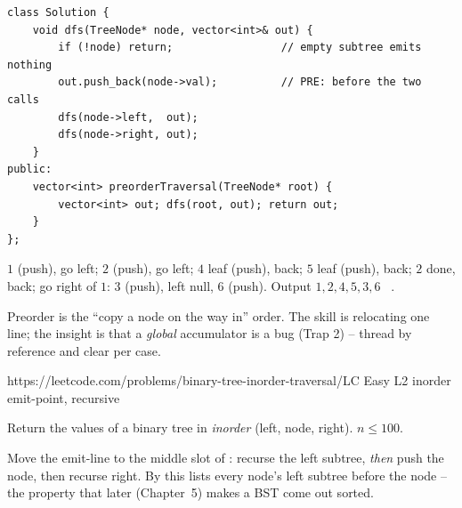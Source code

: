 \begin{lstlisting}[caption={Preorder (LeetCode 144)}, label={lst:c03-preorder}]
class Solution {
    void dfs(TreeNode* node, vector<int>& out) {
        if (!node) return;                 // empty subtree emits nothing
        out.push_back(node->val);          // PRE: before the two calls
        dfs(node->left,  out);
        dfs(node->right, out);
    }
public:
    vector<int> preorderTraversal(TreeNode* root) {
        vector<int> out; dfs(root, out); return out;
    }
};
\end{lstlisting}

\begin{tracebox}[On $R$]
$1$ (push), go left; $2$ (push), go left; $4$ leaf (push), back; $5$ leaf (push),
back; $2$ done, back; go right of $1$: $3$ (push), left null, $6$ (push).
Output $1,2,4,5,3,6$ \checkmark\ .
\end{tracebox}


\begin{insightbox}
Preorder is the ``copy a node on the way in'' order. The  skill is relocating one
line; the  insight is that a \emph{global} accumulator is a bug (Trap 2) -- thread
 by reference and clear per case.
\end{insightbox}

  {https://leetcode.com/problems/binary-tree-inorder-traversal/}{LC Easy L2}
  {inorder emit-point, recursive}

\begin{problemstatement}
Return the values of a binary tree in \emph{inorder} (left, node, right). $n \le 100$.
\end{problemstatement}

Move the emit-line to the middle slot of : recurse the left subtree,
\emph{then} push the node, then recurse right. By  this lists
every node's left subtree before the node -- the property that later (Chapter~5) makes a
BST come out sorted.

